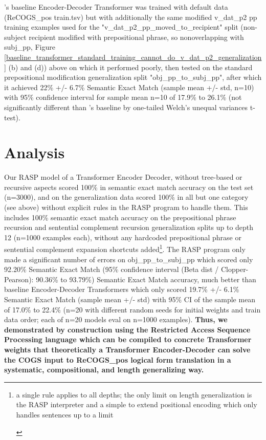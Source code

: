 \documentclass[11pt]{article}
\begin{document}
\cite{Wu2023}'s baseline Encoder-Decoder Transformer was trained with default data (ReCOGS\_pos train.tsv) but with additionally the same modified v\_dat\_p2 pp training examples used for the "v\_dat\_p2\_pp\_moved\_to\_recipient" split (non-subject recipient modified with prepositional phrase, so nonoverlapping with subj\_pp, Figure \ref{baseline_transformer_standard_training_cannot_do_v_dat_p2_generalization} (b) and (d)) above on which it performed poorly, then tested on the standard prepositional modification generalization split "obj\_pp\_to\_subj\_pp", after which it achieved 22\% +/- 6.7\% Semantic Exact Match (sample mean +/- std, n=10) with 95\% confidence interval for sample mean n=10 of 17.9\% to 26.1\% (not significantly different than \cite{Wu2023}'s baseline by one-tailed Welch's unequal variances t-test). 

\section{Analysis} 
Our RASP model of a Transformer Encoder Decoder, without tree-based or recursive aspects scored 100\% in semantic exact match accuracy on the \cite{Wu2023} test set (n=3000), and on the generalization data scored 100\% in all but one category (see above) without explicit rules in the RASP program to handle them. This includes 100\% semantic exact match accuracy on the prepositional phrase recursion and sentential complement recursion generalization splits up to depth 12 (n=1000 examples each), without any hardcoded prepositional phrase or sentential complement expansion shortcuts added\footnote{\begin{footnotesize}a single rule applies to all depths; the only limit on length generalization is the RASP interpreter and a simple to extend positional encoding which only handles sentences up to a limit
\end{footnotesize}}. The RASP program only made a significant number of errors on obj\_pp\_to\_subj\_pp which scored only 92.20\% Semantic Exact Match (95\% confidence interval (Beta dist / Clopper-Pearson): 90.36\% to 93.79\%) Semantic Exact Match accuracy, much better than \cite{Wu2023} baseline Encoder-Decoder Transformers which only scored 19.7\% +/- 6.1\% Semantic Exact Match (sample mean +/- std) with 95\% CI of the sample mean of 17.0\% to 22.4\% (n=20 with different random seeds for initial weights and train data order; each of n=20 models eval on n=1000 examples). \textbf{Thus, we demonstrated by construction using the Restricted Access Sequence Processing language which can be compiled to concrete Transformer weights that theoretically a Transformer Encoder-Decoder can solve the COGS input to ReCOGS\_pos logical form translation in a systematic, compositional, and length generalizing way.}
\end{document}
